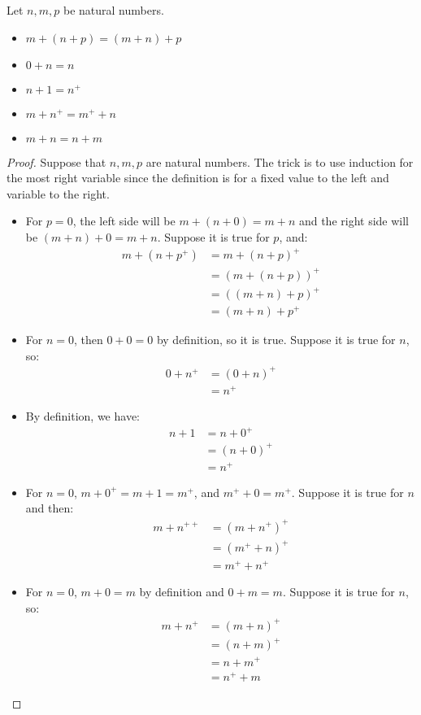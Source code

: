 \documentclass{tufte-handout}
\begin{document}
\begin{theorem}[Properties of $+$]
	Let $n, m, p$ be natural numbers.
	\begin{itemize}
		\item $m + (n + p) = (m + n) + p$
		\item $0 + n = n$
		\item $n + 1 = n^+$
		\item $m + n^+ = m^+ + n$
		\item $m + n = n + m$
	\end{itemize}
\end{theorem}
\begin{proof}
	Suppose that $n, m, p$ are natural numbers. The trick is to use induction for the most right variable since the definition is for a fixed value to the left and variable to the right.
	\begin{itemize}
		\item For $p = 0$, the left side will be $m + (n + 0) = m + n$ and the right side will be $(m + n) + 0 = m + n$. Suppose it is true for $p$, and:
		\begin{align*}
			m + (n + p^+) &= m + (n + p)^+\\
			&= (m + (n + p))^+\\
			&= ((m + n) + p)^+\\
			&= (m + n) + p^+
		\end{align*} 

		\item For $n = 0$, then $0 + 0 = 0$ by definition, so it is true. Suppose it is true for $n$, so:
		\begin{align*}
			0 + n^+ &= (0 + n)^+\\
			&= n^+
		\end{align*}

		\item By definition, we have:
		\begin{align*}
			n + 1 &= n + 0^+\\
			&= (n + 0)^+\\
			&= n^+
		\end{align*}

		\item For $n = 0$, $m + 0^+ = m +1 = m^+$, and $m^+ + 0 = m^+$. Suppose it is true for $n$ and then:
		\begin{align*}
			m + n^{++} &= (m + n^+)^+\\
			&= (m^+ + n)^+\\
			&= m^+ + n^+
		\end{align*} 

		\item For $n = 0$, $m + 0 = m$ by definition and $0 + m = m$. Suppose it is true for $n$, so:
		\begin{align*}
			m + n^+ &= (m + n)^+\\
			&= (n + m)^+\\
			&= n + m^+\\
			&= n^+ + m
		\end{align*}
	\end{itemize}
\end{proof}
\end{document}
